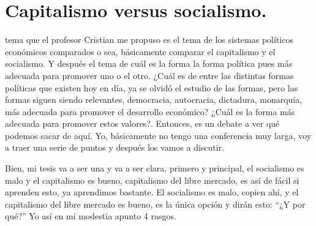 \chapter{Capitalismo versus socialismo.}

{}
{}


 tema que el profesor Cristian me propuso es el tema de los sistemas políticos económicos comparados o sea, básicamente comparar el capitalismo y el socialismo. Y después el tema de cuál es la forma la forma política pues más adecuada para promover uno o el otro. ¿Cuál es de entre las distintas formas políticas que existen hoy en día, ya se olvidó el estudio de las formas, pero las formas siguen siendo relevantes, democracia, autocracia, dictadura, monarquía, más adecuada para promover el desarrollo económico? ¿Cuál es la forma más adecuada para promover estos valores?. Entonces, es un debate a ver qué podemos sacar de aquí. Yo, básicamente no tengo una conferencia muy larga, voy a traer una serie de puntos y después los vamos a discutir.

Bien, mi tesis va a ser una y va a ser clara, primero y principal, el socialismo es malo y el capitalismo es bueno, capitalismo del libre mercado, es así de fácil si aprenden esto, ya aprendimos bastante. El socialismo es malo, copien ahí, y el capitalismo del libre mercado es bueno, es la única opción y dirán esto: \enquote{¿Y por qué?} Yo así en mi modestia apunto 4 rasgos.

